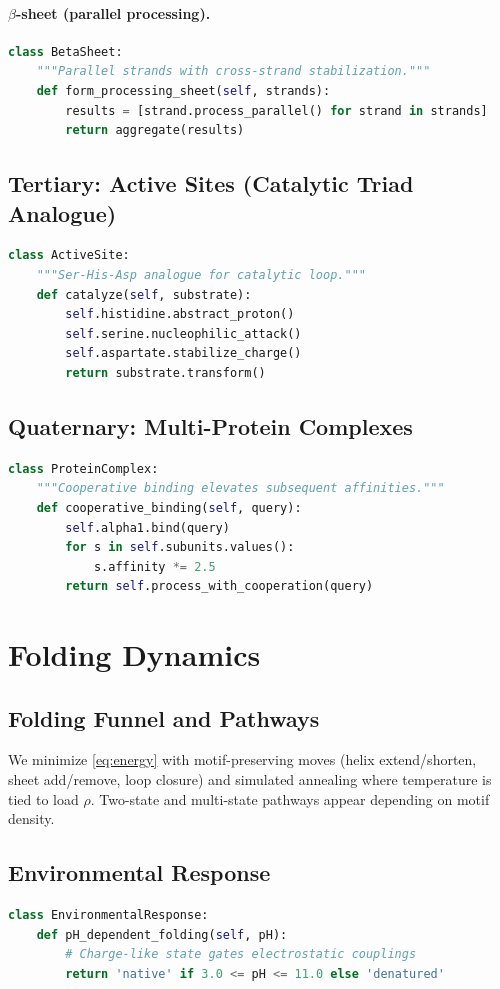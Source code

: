 \documentclass[11pt]{article}
\begin{document}
\paragraph{$\beta$-sheet (parallel processing).}
\begin{lstlisting}[style=code,language=Python]
class BetaSheet:
    """Parallel strands with cross-strand stabilization."""
    def form_processing_sheet(self, strands):
        results = [strand.process_parallel() for strand in strands]
        return aggregate(results)
\end{lstlisting}
\subsection{Tertiary: Active Sites (Catalytic Triad Analogue)}
\begin{lstlisting}[style=code,language=Python]
class ActiveSite:
    """Ser-His-Asp analogue for catalytic loop."""
    def catalyze(self, substrate):
        self.histidine.abstract_proton()
        self.serine.nucleophilic_attack()
        self.aspartate.stabilize_charge()
        return substrate.transform()
\end{lstlisting}
\subsection{Quaternary: Multi-Protein Complexes}
\begin{lstlisting}[style=code,language=Python]
class ProteinComplex:
    """Cooperative binding elevates subsequent affinities."""
    def cooperative_binding(self, query):
        self.alpha1.bind(query)
        for s in self.subunits.values():
            s.affinity *= 2.5
        return self.process_with_cooperation(query)
\end{lstlisting}
\section{Folding Dynamics}
\subsection{Folding Funnel and Pathways}
We minimize \cref{eq:energy} with motif-preserving moves (helix extend/shorten, sheet add/remove, loop closure) and simulated annealing where temperature is tied to load $\rho$. Two-state and multi-state pathways appear depending on motif density.
\subsection{Environmental Response}
\begin{lstlisting}[style=code,language=Python]
class EnvironmentalResponse:
    def pH_dependent_folding(self, pH):
        # Charge-like state gates electrostatic couplings
        return 'native' if 3.0 <= pH <= 11.0 else 'denatured'
\end{lstlisting}
\end{document}
